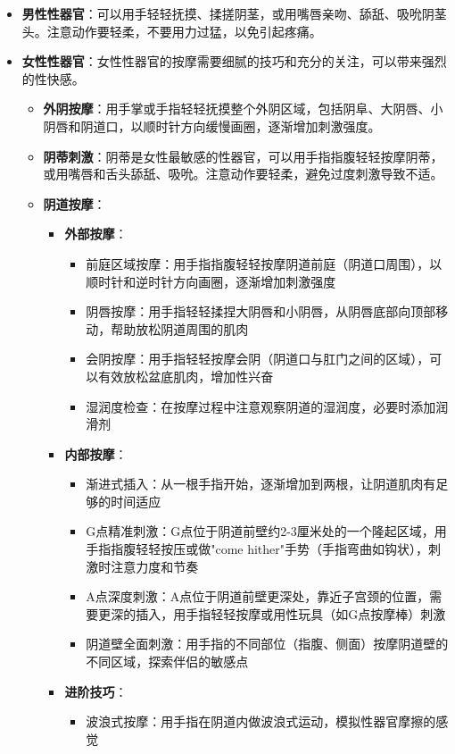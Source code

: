 \documentclass[12pt,UTF8]{ctexbook}
\begin{document}
\begin{itemize}
\item \textbf{男性性器官}：可以用手轻轻抚摸、揉搓阴茎，或用嘴唇亲吻、舔舐、吸吮阴茎头。注意动作要轻柔，不要用力过猛，以免引起疼痛。
\item \textbf{女性性器官}：女性性器官的按摩需要细腻的技巧和充分的关注，可以带来强烈的性快感。
  \begin{itemize}
  \item \textbf{外阴按摩}：用手掌或手指轻轻抚摸整个外阴区域，包括阴阜、大阴唇、小阴唇和阴道口，以顺时针方向缓慢画圈，逐渐增加刺激强度。
  \item \textbf{阴蒂刺激}：阴蒂是女性最敏感的性器官，可以用手指指腹轻轻按摩阴蒂，或用嘴唇和舌头舔舐、吸吮。注意动作要轻柔，避免过度刺激导致不适。
  \item \textbf{阴道按摩}：
    \begin{itemize}
    \item \textbf{外部按摩}：
      \begin{itemize}
      \item 前庭区域按摩：用手指指腹轻轻按摩阴道前庭（阴道口周围），以顺时针和逆时针方向画圈，逐渐增加刺激强度
      \item 阴唇按摩：用手指轻轻揉捏大阴唇和小阴唇，从阴唇底部向顶部移动，帮助放松阴道周围的肌肉
      \item 会阴按摩：用手指轻轻按摩会阴（阴道口与肛门之间的区域），可以有效放松盆底肌肉，增加性兴奋
      \item 湿润度检查：在按摩过程中注意观察阴道的湿润度，必要时添加润滑剂
      \end{itemize}
    \item \textbf{内部按摩}：
      \begin{itemize}
      \item 渐进式插入：从一根手指开始，逐渐增加到两根，让阴道肌肉有足够的时间适应
      \item G点精准刺激：G点位于阴道前壁约2-3厘米处的一个隆起区域，用手指指腹轻轻按压或做"come hither"手势（手指弯曲如钩状），刺激时注意力度和节奏
      \item A点深度刺激：A点位于阴道前壁更深处，靠近子宫颈的位置，需要更深的插入，用手指轻轻按摩或用性玩具（如G点按摩棒）刺激
      \item 阴道壁全面刺激：用手指的不同部位（指腹、侧面）按摩阴道壁的不同区域，探索伴侣的敏感点
      \end{itemize}
    \item \textbf{进阶技巧}：
      \begin{itemize}
      \item 波浪式按摩：用手指在阴道内做波浪式运动，模拟性器官摩擦的感觉

\end{itemize}
\end{itemize}
\end{itemize}
\end{itemize}
\end{document}
